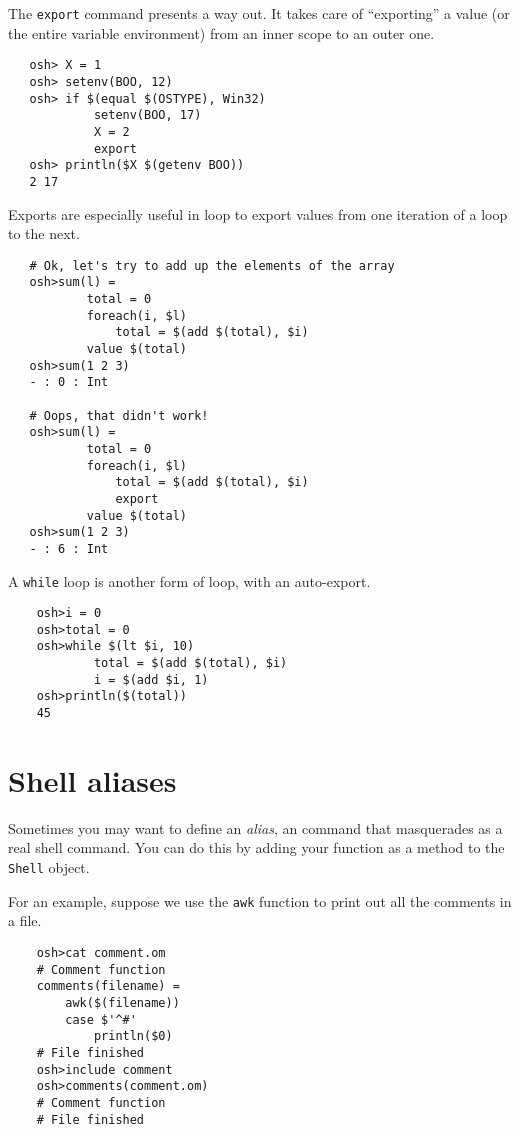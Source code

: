 The \verb+export+ command presents a way out.  It takes care of ``exporting'' a value (or the entire
variable environment) from an inner scope to an outer one.

\begin{verbatim}
   osh> X = 1
   osh> setenv(BOO, 12)
   osh> if $(equal $(OSTYPE), Win32)
            setenv(BOO, 17)
            X = 2
            export
   osh> println($X $(getenv BOO))
   2 17
\end{verbatim}

Exports are especially useful in loop to export values from one iteration of a loop to the next.

\begin{verbatim}
   # Ok, let's try to add up the elements of the array
   osh>sum(l) =
           total = 0
           foreach(i, $l)
               total = $(add $(total), $i)
           value $(total)
   osh>sum(1 2 3)
   - : 0 : Int

   # Oops, that didn't work!
   osh>sum(l) =
           total = 0
           foreach(i, $l)
               total = $(add $(total), $i)
               export
           value $(total)
   osh>sum(1 2 3)
   - : 6 : Int
\end{verbatim}

A \verb+while+ loop is another form of loop, with an auto-export.

\begin{verbatim}
    osh>i = 0
    osh>total = 0
    osh>while $(lt $i, 10)
            total = $(add $(total), $i)
            i = $(add $i, 1)
    osh>println($(total))
    45
\end{verbatim}

\section{Shell aliases}

Sometimes you may want to define an \emph{alias}, an \OMake{} command that masquerades as a real shell
command.  You can do this by adding your function as a method to the \verb+Shell+ object.

For an example, suppose we use the \verb+awk+ function to print out all the comments in a file.

\begin{verbatim}
    osh>cat comment.om
    # Comment function
    comments(filename) =
        awk($(filename))
        case $'^#'
            println($0)
    # File finished
    osh>include comment
    osh>comments(comment.om)
    # Comment function
    # File finished
\end{verbatim}

